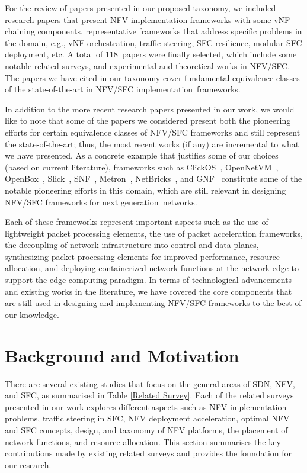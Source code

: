 \documentclass[futureinternet,review,accept,pdftex,moreauthors]{Definitions/mdpi}
\begin{document}
For the review of papers presented in our proposed taxonomy, we included research papers that present NFV implementation frameworks with some vNF chaining components, representative frameworks that address specific problems in the domain, e.g., vNF orchestration, traffic steering, SFC resilience, modular SFC deployment, etc. A total of 118~papers were finally selected, which include some notable related surveys, and experimental and theoretical works in NFV/SFC. The papers we have cited in our taxonomy cover fundamental equivalence classes of the state-of-the-art in NFV/SFC implementation~frameworks. 

In addition to the more recent research papers presented in our work, we would like to note that some of the papers we considered present both the pioneering efforts for certain equivalence classes of NFV/SFC frameworks and still represent the state-of-the-art; thus, the most recent works (if any) are incremental to what we have presented. As a concrete example that justifies some of our choices (based on current literature), frameworks such as ClickOS~\cite{martins2014clickos}, OpenNetVM~\cite{zhang2016opennetvm}, OpenBox~\cite{bremler2016openbox}, Slick~\cite{anwer2015programming}, SNF~\cite{katsikas2016snf}, Metron~\cite{katsikas2018metron}, NetBricks~\cite{panda2016netbricks}, and GNF~\cite{cziva2015container} constitute some of the notable pioneering efforts in this domain, which are still relevant in designing NFV/SFC frameworks for next generation~networks.

Each of these frameworks represent important aspects such as the use of lightweight packet processing elements, the use of packet acceleration frameworks, the decoupling of network infrastructure into control and data-planes, synthesizing packet processing elements for improved performance, resource allocation, and deploying containerized network functions at the network edge to support the edge computing paradigm. In terms of technological advancements and existing works in the literature, we have covered the core components that are still used in designing and implementing NFV/SFC frameworks to the best of our knowledge.  

\section{Background and Motivation} 
\label{MOTIVATION}
There are several existing studies that focus on the general areas of SDN, NFV, and SFC, as summarised in Table \ref{Related Survey}. Each of the related surveys presented in our work explores different aspects such as NFV implementation problems, traffic steering in SFC, NFV deployment acceleration, optimal NFV and SFC concepts, design, and taxonomy of NFV platforms, the placement of network functions, and resource allocation. This section summarises the key contributions made by existing related surveys and provides the foundation for our research.
\end{document}
